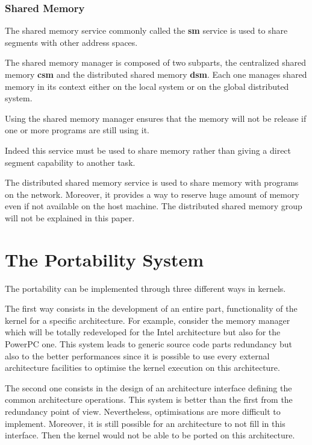 \begin{multicols}{2}
\subsubsection{Shared Memory}

The shared memory service commonly called the \textbf{sm} service is used
to share segments with other address spaces.

The shared memory manager is composed of two subparts, the centralized
shared memory \textbf{csm} and the distributed shared memory \textbf{dsm}.
Each one manages shared memory in its context either on the local system
or on the global distributed system.

Using the shared memory manager ensures that the memory will not be release
if one or more programs are still using it.

Indeed this service must be used to share memory rather than giving
a direct segment capability to another task.

The distributed shared memory service is used to share memory with
programs on the network. Moreover, it provides a way to reserve huge amount
of memory even if not available on the host machine. The distributed shared
memory group will not be explained in this paper.

%
%

\section{The Portability System}

The portability can be implemented through three different ways in kernels.

The first way consists in the development of an entire part, functionality
of the kernel for a specific architecture. For example, consider the
memory manager which will be totally redeveloped for the Intel architecture
but also for the PowerPC one. This system leads to generic source code parts
redundancy but also to the better performances since it is possible
to use every external architecture facilities to optimise the kernel
execution on this architecture.

The second one consists in the design of an architecture interface defining
the common architecture operations. This system is better than the first
from the redundancy point of view. Nevertheless, optimisations are more
difficult to implement. Moreover, it is still possible for an architecture
to not fill in this interface. Then the kernel would not be able to be
ported on this architecture.


\end{multicols}
